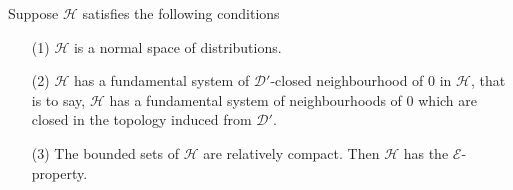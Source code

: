 \begin{prop}\label{chap3:prpo3.3}
Suppose $\mathscr{H}$ satisfies the following conditions
\begin{itemize}
\item [(1)] $\mathscr{H}$ is a normal space of distributions.
\item [(2)] $\mathscr{H}$ has a fundamental system of
  $\mathscr{D}'$-closed neighbourhood of $0$ in $\mathscr{H}$, that is
  to say, $\mathscr{H}$ has a fundamental system of neighbourhoods of
  $0$ which are closed in the topology induced from $\mathscr{D}'$.
\item [(3)] The bounded sets of $\mathscr{H}$ are relatively
  compact. Then $\mathscr{H}$ has the $\mathcal{E}$-property.
\end{itemize} 
\end{prop}

